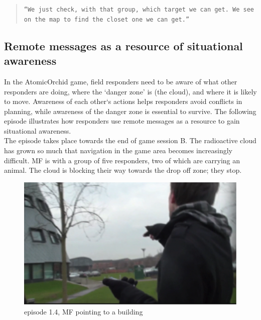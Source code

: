 \begin{quote}
\texttt{``We just check, with that group, which target we can get. We see on the map to find the closet one we can get.''}
\end{quote}




\subsection{Remote messages as a resource of situational awareness} \label{sec:study1awareness}
In the AtomicOrchid game, field responders need to be aware of what other responders are doing, where the `danger zone' is (the cloud), and where it is likely to move. Awareness of each other`s actions helps responders avoid conflicts in planning, while awareness of the danger zone is essential to survive. The following episode illustrates how responders use remote messages as a resource to gain situational awareness.\\

The episode takes place towards the end of game session B. The radioactive cloud has grown so much that navigation in the game area becomes increasingly difficult. MF is with a group of five responders, two of which are carrying an animal. The cloud is blocking their way towards the drop off zone; they stop.\\

\begin{figure}[h]
  \centering
  \includegraphics[width=1\textwidth]{img/study1/ep3/ep31}
  \caption{episode 1.4, MF pointing to a building}
  \label{fig:study1ep31}
\end{figure}

